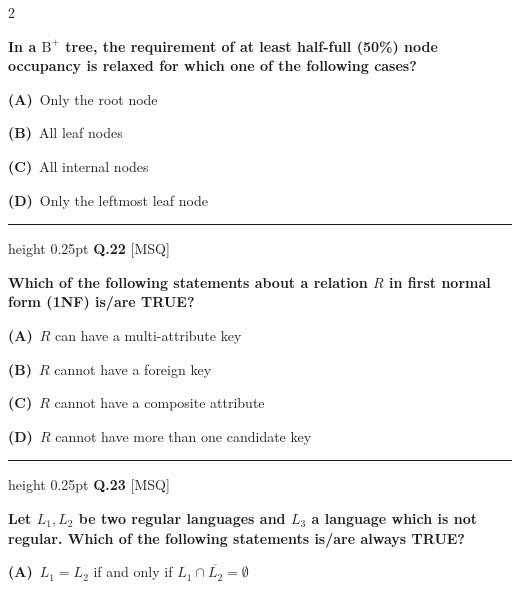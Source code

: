 \documentclass[a4paper,10pt,twoside]{article}
\begin{document}
\begin{multicols}{2}
{\bfseries In a $\text{B}^+$ tree, the requirement of at least half-full (50\%) node occupancy is relaxed for which one of the following cases? \par}
\par\vspace{2pt}\noindent
\textbf{(A)}~Only the root node\par\vspace{2pt}\noindent
\textbf{(B)}~All leaf nodes\par\vspace{2pt}\noindent
\textbf{(C)}~All internal nodes\par\vspace{2pt}\noindent
\textbf{(D)}~Only the leftmost leaf node
\par\vspace{6pt}\hrule height 0.25pt\vspace{6pt}
\noindent\textbf{Q.22} \hfill {\footnotesize\textsf{[MSQ]}}
\par\vspace{2pt}
{\bfseries Which of the following statements about a relation $R$ in first normal form (1NF) is/are TRUE? \par}
\par\vspace{2pt}\noindent
\textbf{(A)}~$R$ can have a multi-attribute key\par\vspace{2pt}\noindent
\textbf{(B)}~$R$ cannot have a foreign key\par\vspace{2pt}\noindent
\textbf{(C)}~$R$ cannot have a composite attribute\par\vspace{2pt}\noindent
\textbf{(D)}~$R$ cannot have more than one candidate key
\par\vspace{6pt}\hrule height 0.25pt\vspace{6pt}
\noindent\textbf{Q.23} \hfill {\footnotesize\textsf{[MSQ]}}
\par\vspace{2pt}
{\bfseries Let $L_1, L_2$ be two regular languages and $L_3$ a language which is not regular. Which of the following statements is/are always TRUE? \par}
\par\vspace{2pt}\noindent
\textbf{(A)}~$L_1 = L_2$ if and only if $L_1 \cap \overline{L_2} = \emptyset$\par\vspace{2pt}\noindent

\end{multicols}
\end{document}
